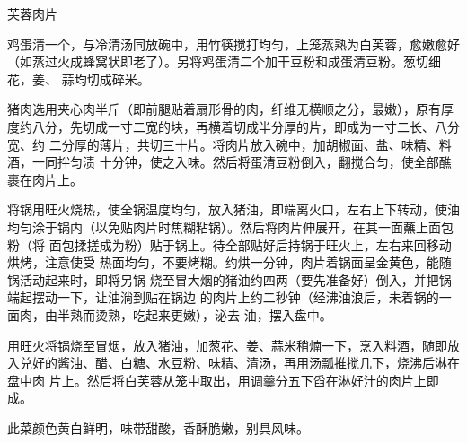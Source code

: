 \begin{recipe}{芙蓉肉片}

\ingredients


\cooking

\step 鸡蛋清一个，与冷清汤同放碗中，用竹筷搅打均匀，上笼蒸熟为白芙蓉，愈嫩愈好
（如蒸过火成蜂窝状即老了）。另将鸡蛋清二个加干豆粉和成蛋清豆粉。葱切细花，姜、
蒜均切成碎米。

\step 猪肉选用夹心肉半斤（即前腿贴着扇形骨的肉，纤维无横顺之分，最嫩），原有厚
度约八分，先切成一寸二宽的块，再横着切成半分厚的片，即成为一寸二长、八分宽、约
二分厚的薄片，共切三十片。将肉片放入碗中，加胡椒面、盐、味精、料酒，一同拌匀渍
十分钟，使之入味。然后将蛋清豆粉倒入，翻搅合匀，使全部醮裹在肉片上。

\step 将锅用旺火烧热，使全锅温度均匀，放入猪油，即端离火口，左右上下转动，使油
均匀涂于锅内（以免贴肉片时焦糊粘锅）。然后将肉片伸展开，在其一面蘸上面包粉（将
面包揉搓成为粉）贴于锅上。待全部贴好后持锅于旺火上，左右来回移动烘烤，注意使受
热面均匀，不要烤糊。约烘一分钟，肉片着锅面呈金黄色，能随锅活动起来时，即将另锅
烧至冒大烟的猪油约四两（要先准备好）倒入，并把锅端起摆动一下，让油淌到贴在锅边
的肉片上约二秒钟（经沸油浪后，未着锅的一面肉，由半熟而烫熟，吃起来更嫩），泌去
油，摆入盘中。

\step 用旺火将锅烧至冒烟，放入猪油，加葱花、姜、蒜米稍煵一下，烹入料酒，随即放
入兑好的酱油、醋、白糖、水豆粉、味精、清汤，再用汤瓢推搅几下，烧沸后淋在盘中肉
片上。然后将白芙蓉从笼中取出，用调羹分五下舀在淋好汁的肉片上即成。

\features

此菜颜色黄白鲜明，味带甜酸，香酥脆嫩，别具风味。

\end{recipe}

